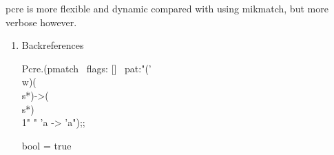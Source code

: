 
pcre is more flexible and dynamic compared with using mikmatch, but
more verbose however.
\begin{enumerate}
\item Backreferences

  \begin{redcode}
 Pcre.(pmatch ~flags: [] ~pat:"('\\w)(\\s*)->(\\s*)\\1" " 'a -> 'a");;    
\end{redcode}
\begin{bluecode}
bool = true  
\end{bluecode}

\end{enumerate}
